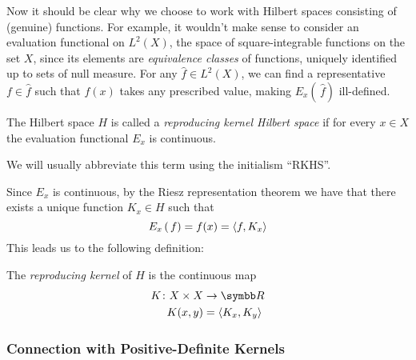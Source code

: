 \begin{remark*}
Now it should be clear why we choose to work with Hilbert spaces consisting of (genuine) functions. For example, it wouldn't make sense to consider an evaluation functional on \(L^2 (X)\), the space of square-integrable functions on the set \(X\), since its elements are \emph{equivalence classes} of functions, uniquely identified up to sets of null measure. For any \(\widehat{f} \in L^2 (X)\), we can find a representative \(f \in \widehat{f}\) such that \(f(x)\) takes any prescribed value, making \(E_x \left(\, \widehat{f} \right)\) ill-defined.
\end{remark*}

\begin{definition}
The Hilbert space \(H\) is called a \emph{reproducing kernel Hilbert space} if for every \(x \in X\) the evaluation functional \(E_x\) is continuous.
\end{definition}

We will usually abbreviate this term using the initialism ``RKHS''.

Since \(E_x\) is continuous, by the Riesz representation theorem we have that there exists a unique function \(K_x \in H\) such that
\[
    E_x \left(\, f \right) = f(x) = \left\langle f, K_x \right\rangle
\]
This leads us to the following definition:
\begin{definition}
The \emph{reproducing kernel} of \(H\) is the continuous map
\begin{align*}
    K \colon X \times X &\to \reals \\
    K (x, y) &= \innerproduct{K_x}{K_y}
\end{align*}
\end{definition}


\subsubsection{Connection with Positive-Definite Kernels}

